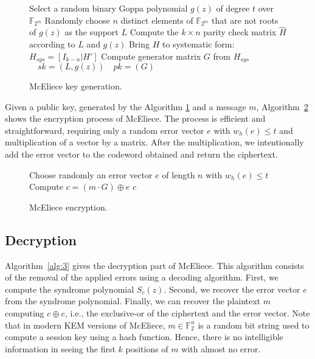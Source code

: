 \begin{figure}
\centering
\begin{algorithm}[H]
 Select a random binary Goppa polynomial $g(z)$ of degree $t$ over $\mathbb{F}_{2^{m}}$\;
 Randomly choose $n$ distinct elements of $\mathbb{F}_{2^m}$ that are not roots of $g(z)$ as the support $L$\;
 Compute the $k \times n$ parity check matrix $\hat{H}$ according to $L$ and $g(z)$\;
 Bring $H$ to systematic form: $H_{sys} = [I_{k-n}|H']$\;
 Compute generator matrix $G$ from $H_{sys}$\;
 \Return $\quad sk = (L, g(z)) \quad pk = (G)$\;
 \caption{McEliece key generation.}
 \label{alg:keygen}
\end{algorithm}
\end{figure}

Given a public key, generated by the Algorithm \ref{alg:keygen} and a message $m$, Algorithm~\ref{alg:2} shows the encryption process of McEliece. The process is efficient and straightforward, requiring only a random error vector $e$ with $w_h(e) \leq t$ and multiplication of a vector by a matrix. After the multiplication, we intentionally add the error vector to the codeword obtained and return the ciphertext.

\begin{figure}
\centering
\begin{algorithm}[H]
Choose randomly an error vector $e$ of length $n$ with $w_h(e)\leq t$\;
Compute $c = (m\cdot G) \oplus e$\;
\Return $c$\;
\caption{McEliece encryption.}\label{alg:2}
\end{algorithm}
\end{figure}

\subsection{Decryption}
\label{sub:mc-dec}
Algorithm~\ref{alg:3} gives the decryption part of McEliece. This algorithm consists of the removal of the applied errors using a decoding algorithm. First, we compute the syndrome polynomial $S_c(z)$. Second, we recover the error vector $e$ from the syndrome polynomial. Finally, we can recover the plaintext $m$ computing $c \oplus e$, i.e., the exclusive-or of the ciphertext and the error vector. Note that in modern KEM versions of McEliece, $m\in \mathbb{F}^n_{2}$ is a random bit string used to compute a session key using a hash function. Hence, there is no intelligible information in seeing the first $k$ positions of $m$ with almost no error.

